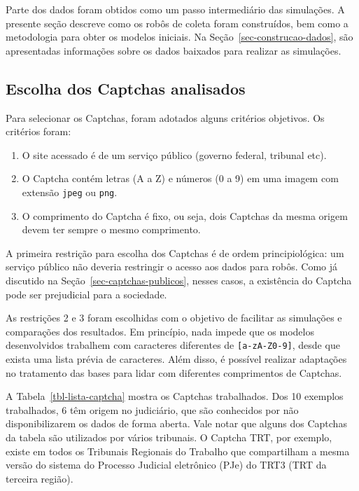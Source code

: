 \documentclass[12pt,twoside,brazilian]{book}
\providecommand{\tightlist}{%
  \setlength{\itemsep}{0pt}\setlength{\parskip}{0pt}}
\begin{document}
Parte dos dados foram obtidos como um passo intermediário das
simulações. A presente seção descreve como os robôs de coleta foram
construídos, bem como a metodologia para obter os modelos iniciais. Na
Seção~\ref{sec-construcao-dados}, são apresentadas informações sobre os
dados baixados para realizar as simulações.

\hypertarget{escolha-dos-captchas-analisados}{%
\subsection{Escolha dos Captchas
analisados}\label{escolha-dos-captchas-analisados}}

Para selecionar os Captchas, foram adotados alguns critérios objetivos.
Os critérios foram:

\begin{enumerate}
\def\labelenumi{\arabic{enumi}.}
\tightlist
\item
  O site acessado é de um serviço público (governo federal, tribunal
  etc).
\item
  O Captcha contém letras (A a Z) e números (0 a 9) em uma imagem com
  extensão \texttt{jpeg} ou \texttt{png}.
\item
  O comprimento do Captcha é fixo, ou seja, dois Captchas da mesma
  origem devem ter sempre o mesmo comprimento.
\end{enumerate}

A primeira restrição para escolha dos Captchas é de ordem
principiológica: um serviço público não deveria restringir o acesso aos
dados para robôs. Como já discutido na
Seção~\ref{sec-captchas-publicos}, nesses casos, a existência do Captcha
pode ser prejudicial para a sociedade.

As restrições 2 e 3 foram escolhidas com o objetivo de facilitar as
simulações e comparações dos resultados. Em princípio, nada impede que
os modelos desenvolvidos trabalhem com caracteres diferentes de
\texttt{{[}a-zA-Z0-9{]}}, desde que exista uma lista prévia de
caracteres. Além disso, é possível realizar adaptações no tratamento das
bases para lidar com diferentes comprimentos de Captchas.

A Tabela~\ref{tbl-lista-captcha} mostra os Captchas trabalhados. Dos 10
exemplos trabalhados, 6 têm origem no judiciário, que são conhecidos por
não disponibilizarem os dados de forma aberta. Vale notar que alguns dos
Captchas da tabela são utilizados por vários tribunais. O Captcha TRT,
por exemplo, existe em todos os Tribunais Regionais do Trabalho que
compartilham a mesma versão do sistema do Processo Judicial eletrônico
(PJe) do TRT3 (TRT da terceira região).
\end{document}
